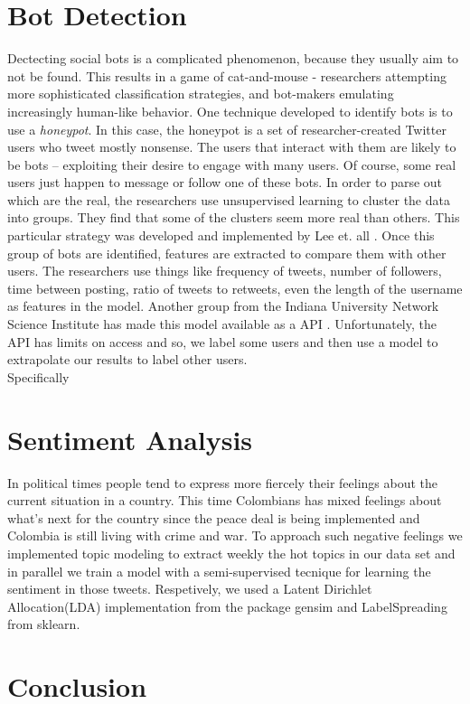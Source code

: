 \documentclass[10pt,a4paper]{article} %
\begin{document}
	\section{Bot Detection} 
		Dectecting social bots is a complicated phenomenon, because they usually aim to not be found.  This results in a game of cat-and-mouse - researchers attempting more sophisticated classification strategies, and bot-makers emulating increasingly human-like behavior.  One technique developed to identify bots is to use a \textit{honeypot}.  In this case, the honeypot is a set of researcher-created Twitter users who tweet mostly nonsense.  The users that interact with them are likely to be bots -- exploiting their desire to engage with many users.  Of course, some real users just happen to message or follow one of these bots.  In order to parse out which are the real, the researchers use unsupervised learning to cluster the data into groups.  They find that some of the clusters seem more real than others.  This particular strategy was developed and implemented by Lee et. all \cite{}.  Once this group of bots are identified, features are extracted to compare them with other users.  The researchers use things like frequency of tweets, number of followers, time between posting, ratio of tweets to retweets, even the length of the username as features in the model.  Another group from the Indiana University Network Science Institute has made this model available as a API \cite{DavisVFFM16}.  Unfortunately, the API has limits on access and so, we label some users and then use a model to extrapolate our results to label other users. \\
		
		\noindent Specifically
	\section{Sentiment Analysis}
	In political times people tend to express more fiercely their feelings about the current situation in a country. This time Colombians has mixed feelings about what's next for the country since the peace deal is being implemented and Colombia is still living with crime and war. To approach such negative feelings we implemented topic modeling to extract weekly the hot topics in our data set and in parallel we train a model with a semi-supervised tecnique for learning the sentiment in those tweets. Respetively, we used a Latent Dirichlet Allocation(LDA) implementation from the package gensim and LabelSpreading from sklearn.
	\section{Conclusion}
	
	\nocite{*}
	
	
\end{document}
